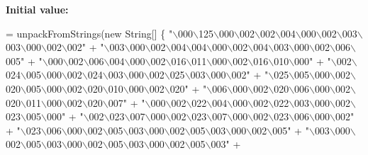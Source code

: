 {\bfseries Initial value\+:}
\begin{DoxyCode}
= 
    unpackFromStrings(\textcolor{keyword}{new} String[] \{
    \textcolor{stringliteral}{"\(\backslash\)000\(\backslash\)125\(\backslash\)000\(\backslash\)002\(\backslash\)002\(\backslash\)004\(\backslash\)000\(\backslash\)002\(\backslash\)003\(\backslash\)003\(\backslash\)000\(\backslash\)002\(\backslash\)002"} +
    \textcolor{stringliteral}{"\(\backslash\)003\(\backslash\)000\(\backslash\)002\(\backslash\)004\(\backslash\)004\(\backslash\)000\(\backslash\)002\(\backslash\)004\(\backslash\)003\(\backslash\)000\(\backslash\)002\(\backslash\)006\(\backslash\)005"} +
    \textcolor{stringliteral}{"\(\backslash\)000\(\backslash\)002\(\backslash\)006\(\backslash\)004\(\backslash\)000\(\backslash\)002\(\backslash\)016\(\backslash\)011\(\backslash\)000\(\backslash\)002\(\backslash\)016\(\backslash\)010\(\backslash\)000"} +
    \textcolor{stringliteral}{"\(\backslash\)002\(\backslash\)024\(\backslash\)005\(\backslash\)000\(\backslash\)002\(\backslash\)024\(\backslash\)003\(\backslash\)000\(\backslash\)002\(\backslash\)025\(\backslash\)003\(\backslash\)000\(\backslash\)002"} +
    \textcolor{stringliteral}{"\(\backslash\)025\(\backslash\)005\(\backslash\)000\(\backslash\)002\(\backslash\)020\(\backslash\)005\(\backslash\)000\(\backslash\)002\(\backslash\)020\(\backslash\)010\(\backslash\)000\(\backslash\)002\(\backslash\)020"} +
    \textcolor{stringliteral}{"\(\backslash\)006\(\backslash\)000\(\backslash\)002\(\backslash\)020\(\backslash\)006\(\backslash\)000\(\backslash\)002\(\backslash\)020\(\backslash\)011\(\backslash\)000\(\backslash\)002\(\backslash\)020\(\backslash\)007"} +
    \textcolor{stringliteral}{"\(\backslash\)000\(\backslash\)002\(\backslash\)022\(\backslash\)004\(\backslash\)000\(\backslash\)002\(\backslash\)022\(\backslash\)003\(\backslash\)000\(\backslash\)002\(\backslash\)023\(\backslash\)005\(\backslash\)000"} +
    \textcolor{stringliteral}{"\(\backslash\)002\(\backslash\)023\(\backslash\)007\(\backslash\)000\(\backslash\)002\(\backslash\)023\(\backslash\)007\(\backslash\)000\(\backslash\)002\(\backslash\)023\(\backslash\)006\(\backslash\)000\(\backslash\)002"} +
    \textcolor{stringliteral}{"\(\backslash\)023\(\backslash\)006\(\backslash\)000\(\backslash\)002\(\backslash\)005\(\backslash\)003\(\backslash\)000\(\backslash\)002\(\backslash\)005\(\backslash\)003\(\backslash\)000\(\backslash\)002\(\backslash\)005"} +
    \textcolor{stringliteral}{"\(\backslash\)003\(\backslash\)000\(\backslash\)002\(\backslash\)005\(\backslash\)003\(\backslash\)000\(\backslash\)002\(\backslash\)005\(\backslash\)003\(\backslash\)000\(\backslash\)002\(\backslash\)005\(\backslash\)003"} +

\end{DoxyCode}
